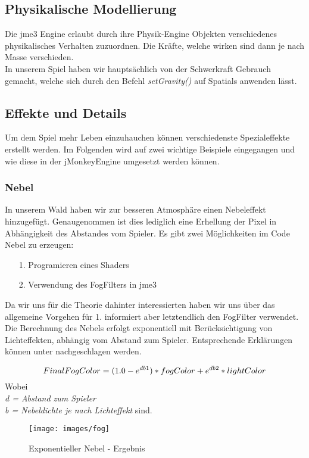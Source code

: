 \subsection{Physikalische Modellierung}
Die jme3 Engine erlaubt durch ihre Physik-Engine Objekten verschiedenes physikalisches Verhalten zuzuordnen. Die Kräfte, welche wirken sind dann je nach Masse verschieden.\\
In unserem Spiel haben wir hauptsächlich von der Schwerkraft Gebrauch gemacht, welche sich durch den Befehl\emph{ setGravity()} auf Spatials anwenden lässt.

\subsection{Effekte und Details}
Um dem Spiel mehr Leben einzuhauchen können verschiedenste Spezialeffekte erstellt werden. Im Folgenden wird auf zwei wichtige Beispiele eingegangen und wie diese in der jMonkeyEngine umgesetzt werden können.
\subsubsection{Nebel}
In unserem Wald haben wir zur besseren Atmosphäre einen Nebeleffekt hinzugefügt. Genaugenommen ist dies lediglich eine Erhellung der Pixel in Abhängigkeit des Abstandes vom Spieler. Es gibt zwei Möglichkeiten im Code Nebel zu erzeugen:
\begin{enumerate}
	\item[1.] Programieren eines Shaders 
	\item[2.] Verwendung des FogFilters in jme3
\end{enumerate}
Da wir uns für die Theorie dahinter interessierten haben wir uns über das allgemeine Vorgehen für 1. informiert aber letztendlich den FogFilter verwendet.
Die Berechnung des Nebels erfolgt exponentiell mit Berücksichtigung von Lichteffekten, abhängig vom Abstand zum Spieler. Entsprechende Erklärungen können unter \cite{Cr14} nachgeschlagen werden.

\begin{equation}
	FinalFogColor = (1.0-e^{db\textrm{1}})*fogColor + e^{db\textrm{2}} * lightColor \\
\end{equation} Wobei \\ \emph{
	d = Abstand zum Spieler} \\
	\emph{b = Nebeldichte je nach Lichteffekt} sind.


\begin{figure}[h!]
	\myfloatalign
	\caption{Exponentieller Nebel - Ergebnis}
	
	\texttt{[image: images/fog]} 
	
\end{figure}

